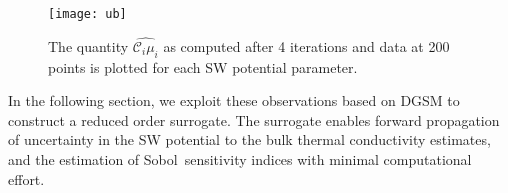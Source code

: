 \begin{figure}[htbp]
 \begin{center}
  \texttt{[image: ub]}
\caption{The quantity $\hat{\mathcal{C}_i\mu_i}$ as computed after 4 iterations and data at 200
points is plotted for each SW potential parameter.}
\label{fig:ub}
\end{center}
\end{figure}

In the following section, we exploit these observations based on DGSM to construct a reduced order surrogate.
The surrogate enables forward propagation of uncertainty in the SW potential to the bulk thermal conductivity 
estimates, and the estimation of Sobol\textquotesingle~sensitivity indices with minimal computational effort. 




























